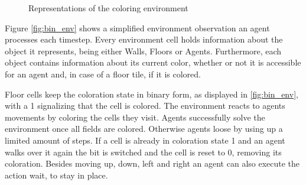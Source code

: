 \begin{figure}[hpbt]
    \centering
    \hspace{0.01\textwidth}
    \caption[Coloring Environment]{Representations of the coloring environment}
    \label{fig:multipic_env} %
\end{figure}

Figure \ref{fig:bin_env} shows a simplified environment observation an agent processes each timestep. Every environment cell holds information about the object it represents, being either Walls, Floors or Agents. Furthermore, each object contains information about its current color, whether or not it is accessible for an agent and, in case of a floor tile, if it is colored.

Floor cells keep the coloration state in binary form, as displayed in \ref{fig:bin_env}, with a 1 signalizing that the cell is colored. The environment reacts to agents movements by coloring the cells they visit. Agents successfully solve the environment once all fields are colored. Otherwise agents loose by using up a limited amount of steps. If a cell is already in coloration state 1 and an agent walks over it again the bit is switched and the cell is reset to 0, removing its coloration. Besides moving up, down, left and right an agent can also execute the action wait, to stay in place.

